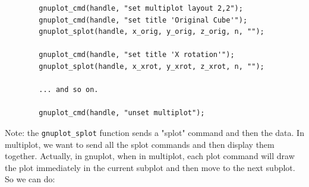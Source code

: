 \documentclass[a4paper,10pt]{article}
\begin{document}
\begin{verbatim}
        gnuplot_cmd(handle, "set multiplot layout 2,2");
        gnuplot_cmd(handle, "set title 'Original Cube'");
        gnuplot_splot(handle, x_orig, y_orig, z_orig, n, "");

        gnuplot_cmd(handle, "set title 'X rotation'");
        gnuplot_splot(handle, x_xrot, y_xrot, z_xrot, n, "");

        ... and so on.

        gnuplot_cmd(handle, "unset multiplot");
\end{verbatim}

Note: the \verb|gnuplot_splot| function sends a "splot" command and then the data. In multiplot, we want to send all the splot commands and then display them together. Actually, in gnuplot, when in multiplot, each plot command will draw the plot immediately in the current subplot and then move to the next subplot. So we can do:\\
\end{document}
